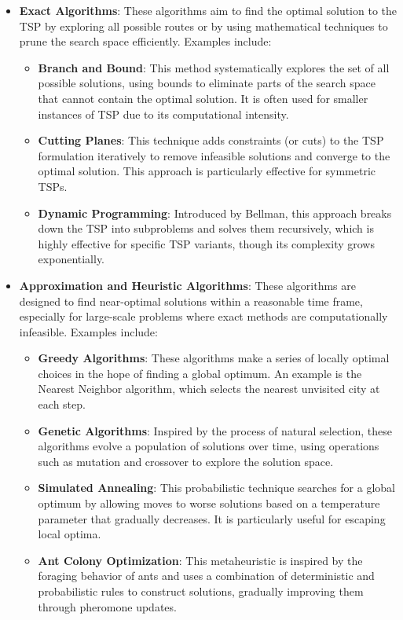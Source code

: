\begin{itemize}
    \item \textbf{Exact Algorithms}: These algorithms aim to find the optimal solution to the TSP by exploring all possible routes or by using mathematical techniques to prune the search space efficiently. Examples include:
          \begin{itemize}
              \item \textbf{Branch and Bound}: This method systematically explores the set of all possible solutions, using bounds to eliminate parts of the search space that cannot contain the optimal solution. It is often used for smaller instances of TSP due to its computational intensity. \cite{branch_and_bound}
              \item \textbf{Cutting Planes}: This technique adds constraints (or cuts) to the TSP formulation iteratively to remove infeasible solutions and converge to the optimal solution. This approach is particularly effective for symmetric TSPs. \cite{cutting_planes}
              \item \textbf{Dynamic Programming}: Introduced by Bellman, this approach breaks down the TSP into subproblems and solves them recursively, which is highly effective for specific TSP variants, though its complexity grows exponentially. \cite{dynamic_programming_tsp}
          \end{itemize}
    \item \textbf{Approximation and Heuristic Algorithms}: These algorithms are designed to find near-optimal solutions within a reasonable time frame, especially for large-scale problems where exact methods are computationally infeasible. Examples include:
          \begin{itemize}
              \item \textbf{Greedy Algorithms}: These algorithms make a series of locally optimal choices in the hope of finding a global optimum. An example is the Nearest Neighbor algorithm, which selects the nearest unvisited city at each step. \cite{greedy}
              \item \textbf{Genetic Algorithms}: Inspired by the process of natural selection, these algorithms evolve a population of solutions over time, using operations such as mutation and crossover to explore the solution space. \cite{genetic_algorithm}
              \item \textbf{Simulated Annealing}: This probabilistic technique searches for a global optimum by allowing moves to worse solutions based on a temperature parameter that gradually decreases. It is particularly useful for escaping local optima. \cite{simulated_annealing}
              \item \textbf{Ant Colony Optimization}: This metaheuristic is inspired by the foraging behavior of ants and uses a combination of deterministic and probabilistic rules to construct solutions, gradually improving them through pheromone updates. \cite{ant_colony}
          \end{itemize}
\end{itemize}

